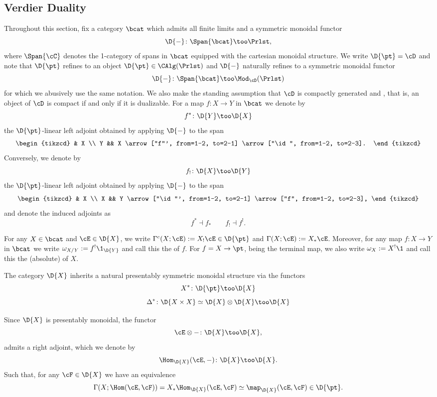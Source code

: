 
\subsection{Verdier Duality}
Throughout this section, fix a category $\bcat$ which admits all finite limits
and a symmetric monoidal functor
\[ \D{-} \colon \Span{\bcat} \too \Prlst,\] where $\Span{\cC}$ denotes the 1-category
of spans in $\bcat$ equipped with the cartesian monoidal structure.
We write $\D{\pt}=\cD$ and note that $\D{\pt}$ refines to an object
$\D{\pt} \in \CAlg(\Prlst)$ and $\D{-}$ naturally refines to a symmetric monoidal functor
\[ \D{-} \colon \Span{\bcat} \too \Mod_{\cD}(\Prlst)\] for which we abusively use
the same notation. We also make the standing assumption that $\cD$ is compactly
generated and , that is, an object of $\cD$ is compact if and only
if it is dualizable.
For a map $f\colon X\to Y$ in $\bcat$ we denote by
\[ f^{\ast}\colon \D{Y} \too \D{X}\] the $\D{\pt}$-linear left adjoint obtained by
applying $\D{-}$ to the span
\[\begin{tikzcd}
    & X \\
    Y && X \arrow["f"', from=1-2, to=2-1] \arrow["\id", from=1-2, to=2-3].
  \end{tikzcd}\] Conversely, we denote by
\[ f_{!}\colon \D{X} \too \D{Y}\] the $\D{\pt}$-linear left adjoint obtained by
applying $\D{-}$ to the span
\[\begin{tikzcd}
    & X \\
    X && Y \arrow["\id"', from=1-2, to=2-1] \arrow["f", from=1-2, to=2-3],
  \end{tikzcd}\] and denote the induced adjoints as
\[ f^{\ast}\dashv f_{\ast} \qquad f_{!} \dashv f^{!}.\]
\begin{defn}
  For any $X\in \bcat$ and $\cE\in \D{X}$, we write
  $\Gamma^{c}(X;\cE):=X_{!}\cE \in \D{\pt}$ and $\Gamma(X;\cE):= X_{\ast}\cE$. Moreover, for
  any map $f\colon X\to Y$ in $\bcat$ we write $\omega_{X/Y}:= f^{!}\1_{\D{Y}}$ and call
  this the  of $f$. For $f=X\to \pt$, being the
  terminal map, we also write $\omega_{X}:=X^{!}\1$ and call this the (absolute)
   of $X$.
\end{defn}

\begin{rmk}
  The category $\D{X}$ inherits a natural presentably symmetric monoidal
  structure via the functors
  \[ X^{\ast}\colon \D{\pt} \too \D{X}\]
  \[ \Delta^{\ast}\colon \D{X \times X} \simeq \D{X} \otimes \D{X} \too \D{X}\]
\end{rmk}
Since $\D{X}$ is presentably monoidal, the functor
\[ \cE \otimes - \colon \D{X} \too \D{X},\] admits a right adjoint, which we denote by
\[ \Hom_{\D{X}}(\cE, -) \colon \D{X} \too \D{X}.\] Such that, for any $\cF\in \D{X}$ we
have an equivalence
\[ \Gamma(X;\Hom(\cE,\cF))=X_{\ast} \Hom_{\D{X}}(\cE, \cF) \simeq \map_{\D{X}}(\cE,\cF) \in \D{\pt}. \]

